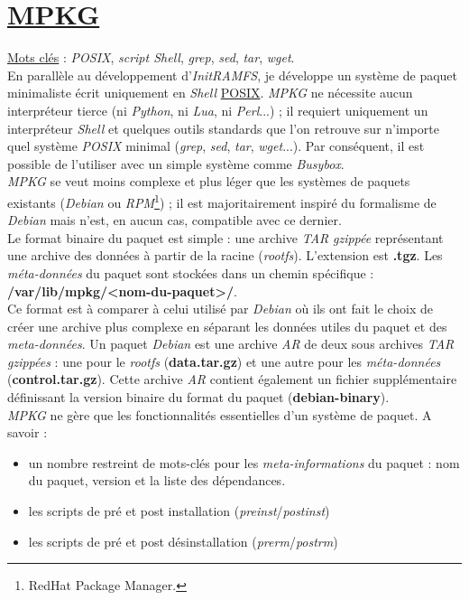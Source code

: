 \documentclass[a4paper]{article}
\begin{document}
\section{\href{https://github.com/gportay/mpkg/}{MPKG}}

\underline{Mots clés} : \textit{POSIX}, \textit{script Shell}, \textit{grep}, \textit{sed}, \textit{tar}, \textit{wget}.\\

En parallèle au développement d'\textit{InitRAMFS}, je développe un système de paquet minimaliste écrit uniquement en \textit{Shell} \href{https://fr.wikipedia.org/wiki/POSIX}{POSIX}. \textit{MPKG} ne nécessite aucun interpréteur tierce (ni \textit{Python}, ni \textit{Lua}, ni \textit{Perl}...) ; il requiert uniquement un interpréteur \textit{Shell} et quelques outils standards que l'on retrouve sur n'importe quel système \textit{POSIX} minimal (\textit{grep}, \textit{sed}, \textit{tar}, \textit{wget}...). Par conséquent, il est possible de l'utiliser avec un simple système comme \textit{Busybox}.\\

\textit{MPKG} se veut moins complexe et plus léger que les systèmes de paquets existants (\textit{Debian} ou \textit{RPM}\footnote{RedHat Package Manager.}) ; il est majoritairement inspiré du formalisme de \textit{Debian} mais n'est, en aucun cas, compatible avec ce dernier.\\

Le format binaire du paquet est simple : une archive \textit{TAR} \textit{gzippée} représentant une archive des données à partir de la racine (\textit{rootfs}). L’extension est \textbf{.tgz}. Les \textit{méta-données} du paquet sont stockées dans un chemin spécifique : \textbf{/var/lib/mpkg/<nom-du-paquet>/}.\\

Ce format est à comparer à celui utilisé par \textit{Debian} où ils ont fait le choix de créer une archive plus complexe en séparant les données utiles du paquet et des \textit{meta-données}. Un paquet \textit{Debian} est une archive \textit{AR} de deux sous archives \textit{TAR} \textit{gzippées} : une pour le \textit{rootfs} (\textbf{data.tar.gz}) et une autre pour les \textit{méta-données} (\textbf{control.tar.gz}). Cette archive \textit{AR} contient également un fichier supplémentaire définissant la version binaire du format du paquet (\textbf{debian-binary}).\\

\textit{MPKG} ne gère que les fonctionnalités essentielles d'un système de paquet. A savoir :
\begin{itemize}
\item un nombre restreint de mots-clés pour les \textit{meta-informations} du paquet : nom du paquet, version et la liste des dépendances.
\item les scripts de pré et post installation (\textit{preinst}/\textit{postinst})
\item les scripts de pré et post désinstallation (\textit{prerm}/\textit{postrm})
\end{itemize}
\end{document}
